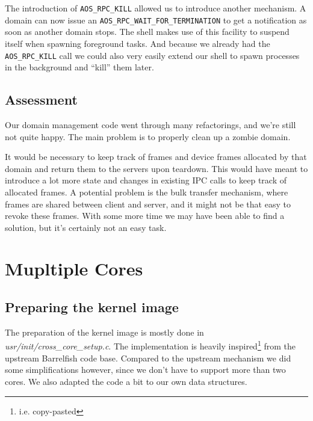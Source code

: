 \documentclass[a4paper,10pt]{article}
\newcommand{\filepath}[1]{\emph{ #1}}
\begin{document}
The introduction of \lstinline!AOS_RPC_KILL! allowed us to introduce another mechanism.
A domain can now issue an \lstinline!AOS_RPC_WAIT_FOR_TERMINATION! to get a notification as soon as another domain stops.
The shell makes use of this facility to suspend itself when spawning foreground tasks.
And because we already had the \lstinline!AOS_RPC_KILL! call we could also very easily extend our shell to spawn processes in the background and ``kill'' them later.

\subsection{Assessment}
Our domain management code went through many refactorings, and we're still not quite happy.
The main problem is to properly clean up a zombie domain.

It would be necessary to keep track of frames and device frames allocated by that domain and return them to the servers upon teardown.
This would have meant to introduce a lot more state and changes in existing IPC calls to keep track of allocated frames.
A potential problem is the bulk transfer mechanism, where frames are shared between client and server, and it might not be that easy to revoke these frames.
With some more time we may have been able to find a solution, but it's certainly not an easy task.


\section{Mupltiple Cores}

\subsection{Preparing the kernel image}

The preparation of the kernel image is mostly done in \filepath{usr/init/cross\_core\_setup.c}.
The implementation is heavily inspired\footnote{i.e. copy-pasted} from the upstream Barrelfish code base.
Compared to the upstream mechanism we did some simplifications however, since we don't have to support more than two cores.
We also adapted the code a bit to our own data structures.
\end{document}
